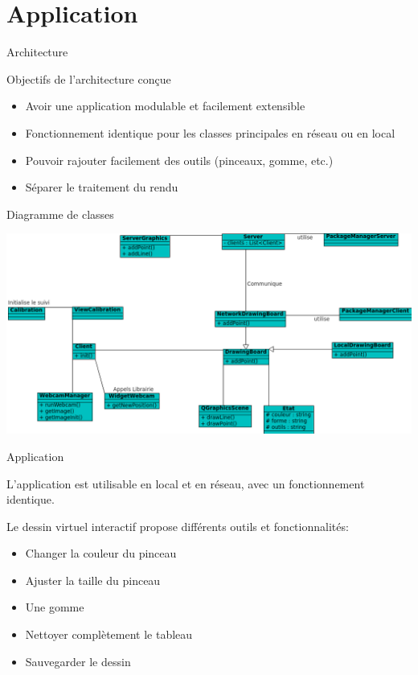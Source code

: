 \documentclass{beamer}
\begin{document}
	\section{Application}
		\begin{frame}{Architecture}
			\begin{block}{Objectifs de l'architecture conçue}
				\begin{itemize}
				\item{Avoir une application modulable et facilement extensible}
				\item{Fonctionnement identique pour les classes principales en réseau ou en local}
				\item{Pouvoir rajouter facilement des outils (pinceaux, gomme, etc.)}
				\item{Séparer le traitement du rendu}
				\end{itemize}
			\end{block}
		\end{frame}
		
		\begin{frame}{Diagramme de classes}
			\begin{center}		
			\includegraphics[scale=0.45]{../uml/classes.png}
			\end{center}
		\end{frame}
		
		\begin{frame}{Application}
			
			L'application est utilisable en local et en réseau, avec un fonctionnement identique.
			
			Le dessin virtuel interactif propose différents outils et fonctionnalités:
       \begin{itemize}
        \item Changer la couleur du pinceau
        \item Ajuster la taille du pinceau
        \item Une gomme
        \item Nettoyer complètement le tableau
        \item Sauvegarder le dessin
      \end{itemize}
		\end{frame}
      
\end{document}
